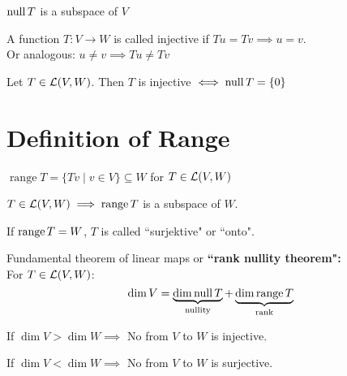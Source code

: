 \setcounter{thm}{12}
\begin{thm}
    $\operatorname{null} T$ is a subspace of $V$
\end{thm}

\setcounter{thm}{13}
\begin{mydef}
    A function $T: V \to W$ is called injective if $Tu = Tv \implies u = v$. \\
Or analogous: $u \neq v \implies Tu \neq Tv$ 
\end{mydef}

\setcounter{thm}{14}
\begin{mydef}
    Let $T \in {\mathcal{L}(V,W)}$. Then $T$ is injective $\iff \operatorname{null} T = \{0 \}$
\end{mydef}

\section{Definition of Range}
\setcounter{thm}{15}
\begin{thm}
    $\operatorname{range}T= \{Tv \mid v \in V\} \subseteq W$ for $T \in {\mathcal{L}(V,W)}$
\end{thm}

\setcounter{thm}{17}
\begin{thm}
    $T\in {\mathcal{L}(V,W)} \implies \operatorname{range} T$ is a subspace of $W$.
\end{thm}

\setcounter{thm}{18}
\begin{mydef}
    If $\operatorname{range} T=W$, $T$ is called ``surjektive" or ``onto".
\end{mydef} 

\setcounter{thm}{20}
\begin{thm}
    \label{rank-nullity-theorem}
    Fundamental theorem of linear maps or \textbf{``rank nullity theorem":} \\
    For $T \in {\mathcal{L}(V,W)}$:
    \begin{equation}
    	\dim V = 
    	\underbrace{ \dim \operatorname{null} T }_{\text{nullity}}
    	+ \underbrace{\dim \operatorname{range} T}_{\text{rank}}
    \end{equation}
\end{thm}

\setcounter{thm}{21}
\begin{thm}
    If $\dim V > \dim W \implies$ No \lm from $V$ to $W$ is injective. 
\end{thm}

\setcounter{thm}{23}
\begin{thm}
    If $\dim V < \dim W \implies$ No \lm from $V$ to $W$ is surjective.
\end{thm}

